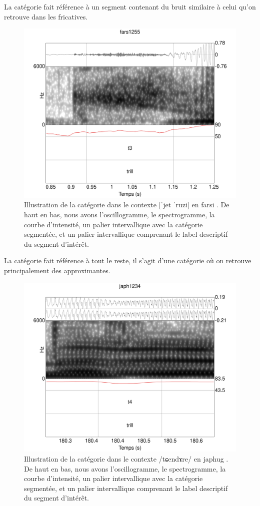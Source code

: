 La catégorie  fait référence à un segment contenant du bruit similaire à celui qu'on retrouve dans les fricatives.\\

\begin{figure}
	\centering
	\includegraphics[width=0.8\linewidth]{substance/spectro_images/fars1255_449_2}
	\caption[Illustration de la catégorie ]{Illustration de la catégorie  dans le contexte [ˈjet ˈruzi] en farsi . De haut en bas, nous avons l'oscillogramme, le spectrogramme, la courbe d'intensité, un palier intervallique avec la catégorie segmentée, et un palier intervallique comprenant le label descriptif du segment d'intérêt.}
	\label{fig:fars12554492}
\end{figure}


La catégorie  fait référence à tout le reste, il s'agit d'une catégorie où on retrouve principalement des approximantes.\\

\begin{figure}
	\centering
	\includegraphics[width=0.8\linewidth]{substance/spectro_images/japh1234_944_70}
	\caption[Illustration de la catégorie ]{Illustration de la catégorie  dans le contexte /tɕendɤre/ en japhug . De haut en bas, nous avons l'oscillogramme, le spectrogramme, la courbe d'intensité, un palier intervallique avec la catégorie segmentée, et un palier intervallique comprenant le label descriptif du segment d'intérêt.}
	\label{fig:japh123494470}
\end{figure}


